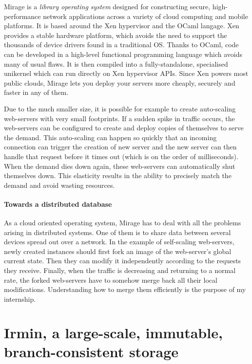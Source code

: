 \documentclass{article}
\newcommand{\irmin}{Irmin\xspace}
\newcommand{\mirage}{Mirage\xspace}
\newcommand{\ocaml}{OCaml\xspace}
\newcommand{\xen}{Xen\xspace}
\begin{document}
\mirage is a \emph{library operating system}\cite{LibraryOperatingSystemsCloud2013} designed for constructing secure, high-performance network applications across a variety of cloud computing and mobile platforms.
It is based around the \xen hypervisor and the \ocaml langage.
\xen provides a stable hardware platform\cite{XenArtVirtualization2003}, which avoids the need to support the thousands of device drivers found in a traditional OS.
Thanks to \ocaml, code can be developed in a high-level functional programming language which avoids many of usual flaws\cite{CreatingFunctionalInternet2007}.
It is then compiled into a fully-standalone, specialised unikernel which can run directly on \xen hypervisor APIs.
Since \xen powers most public clouds, \mirage lets you deploy your servers more cheaply, securely and faster in any of them.

Due to the much smaller size, it is possible for example to create auto-scaling web-servers with very small footprints.
If a sudden spike in traffic occurs, the web-servers can be configured to create and deploy copies of themselves to serve the demand.
This auto-scaling can happen so quickly that an incoming connection can trigger the creation of new server and the new server can then handle that request before it times out (which is on the order of milliseconds).
When the demand dies down again, these web-servers can automatically shut themselves down.
This elasticity results in the ability to precisely match the demand and avoid wasting resources.

\paragraph{Towards a distributed database}
As a cloud oriented operating system, \mirage has to deal with all the problems arising in distributed systems.
One of them is to share data between several devices spread out over a network.
In the example of self-scaling web-servers, newly created instances should first fork an image of the web-server's global current state.
Then they can modify it independently according to the requests they receive.
Finally, when the traffic is decreasing and returning to a normal rate, the forked web-servers have to somehow merge back all their local modifications.
Understanding how to merge them efficiently is the purpose of my internship.



\section{\irmin, a large-scale, immutable, branch-consistent storage}
\end{document}
